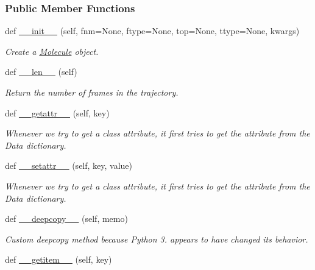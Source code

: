 \subsubsection*{Public Member Functions}
\begin{DoxyCompactItemize}
\item 
def \hyperlink{classsrc_1_1molecule_1_1Molecule_a8c3f5b48ac288e3b251b42d90c8f8016}{\+\_\+\+\_\+init\+\_\+\+\_\+} (self, fnm=None, ftype=None, top=None, ttype=None, kwargs)
\begin{DoxyCompactList}\small\item\em Create a \hyperlink{classsrc_1_1molecule_1_1Molecule}{Molecule} object. \end{DoxyCompactList}\item 
def \hyperlink{classsrc_1_1molecule_1_1Molecule_a23a3a5c340084abc00fb577d2b3c85c2}{\+\_\+\+\_\+len\+\_\+\+\_\+} (self)
\begin{DoxyCompactList}\small\item\em Return the number of frames in the trajectory. \end{DoxyCompactList}\item 
def \hyperlink{classsrc_1_1molecule_1_1Molecule_afbb728fb44c4465e4f53b26a64439165}{\+\_\+\+\_\+getattr\+\_\+\+\_\+} (self, key)
\begin{DoxyCompactList}\small\item\em Whenever we try to get a class attribute, it first tries to get the attribute from the Data dictionary. \end{DoxyCompactList}\item 
def \hyperlink{classsrc_1_1molecule_1_1Molecule_a73f8860755f337e3fafb91d074a7d459}{\+\_\+\+\_\+setattr\+\_\+\+\_\+} (self, key, value)
\begin{DoxyCompactList}\small\item\em Whenever we try to get a class attribute, it first tries to get the attribute from the Data dictionary. \end{DoxyCompactList}\item 
def \hyperlink{classsrc_1_1molecule_1_1Molecule_ac40e3fd2c1f79e316be59016e7dfd253}{\+\_\+\+\_\+deepcopy\+\_\+\+\_\+} (self, memo)
\begin{DoxyCompactList}\small\item\em Custom deepcopy method because Python 3. appears to have changed its behavior. \end{DoxyCompactList}\item 
def \hyperlink{classsrc_1_1molecule_1_1Molecule_a30e057898525695364528d3b02c5762b}{\+\_\+\+\_\+getitem\+\_\+\+\_\+} (self, key)

\end{DoxyCompactItemize}
